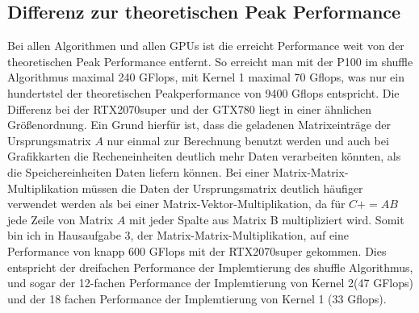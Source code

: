 \documentclass[10pt,a4paper]{article}
\begin{document}
	  \subsection{Differenz zur theoretischen Peak Performance}
	  Bei allen Algorithmen und allen GPUs ist die erreicht Performance weit von der theoretischen Peak Performance entfernt. So erreicht man mit der P100 im shuffle Algorithmus maximal 240 GFlops, mit Kernel 1 maximal 70 Gflops, was nur ein hundertstel der theoretischen Peakperformance von 9400 Gflops entspricht. Die Differenz bei der RTX2070super und der GTX780 liegt in einer ähnlichen Größenordnung. Ein Grund hierfür ist, dass die geladenen Matrixeinträge der Ursprungsmatrix $A$ nur einmal zur Berechnung benutzt werden und auch bei Grafikkarten die Recheneinheiten deutlich mehr Daten verarbeiten könnten, als die Speichereinheiten Daten liefern können. Bei einer Matrix-Matrix-Multiplikation müssen die Daten der Ursprungsmatrix deutlich häufiger verwendet werden als bei einer Matrix-Vektor-Multiplikation, da für $C+=AB$ jede Zeile von Matrix $A$ mit jeder Spalte aus Matrix B multipliziert wird. Somit bin ich in Hausaufgabe 3, der Matrix-Matrix-Multiplikation, auf eine Performance von knapp 600 GFlops mit der RTX2070super gekommen. Dies entspricht der dreifachen Performance der Implemtierung des shuffle Algorithmus, und sogar der 12-fachen Performance der Implemtierung von Kernel 2(47 GFlops) und der 18 fachen Performance der Implemtierung von Kernel 1 (33 Gflops).
\end{document}

